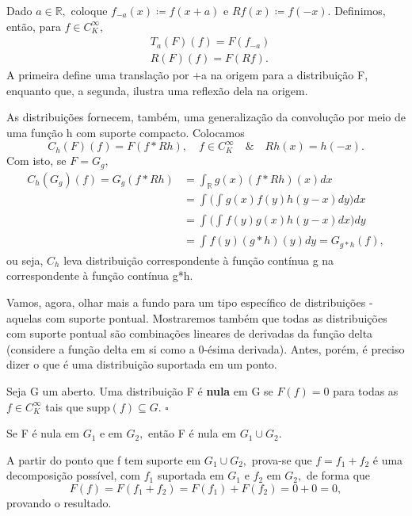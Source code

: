 \documentclass[MeasureTheory/measure_theory.tex]{subfiles}
\begin{document}
\begin{example}
	Dado \(a\in \mathbb{R},\) coloque \(f_{-a}(x)\coloneqq f(x+a)\) e \(Rf(x)\coloneqq f(-x)\). Definimos, então, para \(f\in C_{K}^{\infty},\)
	\begin{align*}
		 & T_{a}(F)(f) = F(f_{-a}) \\
		 & R(F)(f) = F(Rf).
	\end{align*}
	A primeira define uma translação por +a na origem para a distribuição F, enquanto que, a segunda, ilustra uma reflexão dela na origem.
\end{example}
\begin{example}
	As distribuições fornecem, também, uma generalização da convolução por meio de uma função h com suporte compacto. Colocamos
	\[
		C_{h}(F)(f) = F(f*Rh),\quad f\in C_{K}^{\infty}\quad\&\quad Rh(x) = h(-x).
	\]
	Com isto, se \(F = G_{g},\)
	\begin{align*}
		C_{h}(G_{g})(f) = G_{g}(f*Rh) & =\int_{\mathbb{R}}^{}g(x)(f*Rh)(x)dx                   \\
		                              & = \int_{}^{}\biggl(\int_{}^{}g(x)f(y)h(y-x)dy\biggr)dx \\
		                              & = \int_{}^{}\biggl(\int_{}^{}f(y)g(x)h(y-x)dx\biggr)dy \\
		                              & = \int_{}^{}f(y)(g*h)(y)dy = G_{g*h}(f),
	\end{align*}
	ou seja, \(C_{h}\) leva distribuição correspondente à função contínua g na correspondente à função contínua g*h.
\end{example}
Vamos, agora, olhar mais a fundo para um tipo específico de distribuições - aquelas com suporte pontual. Mostraremos também que todas as distribuições com suporte pontual são combinações lineares
de derivadas da função delta (considere a função delta em si como a 0-ésima derivada). Antes, porém, é preciso dizer o que é uma distribuição suportada em um ponto.
\begin{def*}
	Seja G um aberto. Uma distribuição F é \textbf{nula} em G se \(F(f) = 0\) para todas as \(f\in C_{K}^{\infty}\) tais que \(\mathrm{supp}(f)\subseteq G\). \(\square\)
\end{def*}
\begin{lemma*}
	Se F é nula em \(G_{1}\) e em \(G_{2},\) então F é nula em \(G_1\cup G_2\).
\end{lemma*}
\begin{proof*}
	A partir do ponto que f tem suporte em \(G_{1}\cup G_{2},\) prova-se que \(f = f_{1} + f_{2}\) é uma decomposição possível, com \(f_{1}\) suportada em \(G_{1}\) e \(f_{2}\) em \(G_{2},\) de forma que
	\[
		F(f) = F(f_{1} + f_{2}) = F(f_{1}) + F(f_{2}) = 0 + 0 = 0,
	\]
	provando o resultado. \qedsymbol
\end{proof*}
\end{document}
